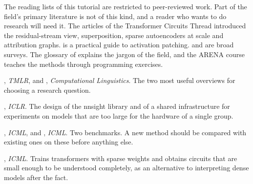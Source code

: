 The reading lists of this tutorial are restricted to peer-reviewed work. Part of the field's primary literature
is not of this kind, and a reader who wants to do research will need it. The articles of the Transformer Circuits
Thread \citep{elhage2021mathematical,elhage2022toy,bricken2023monosemanticity,templeton2024scaling,ameisen2025circuit,lindsey2025biology}
introduced the residual-stream view, superposition, sparse autoencoders at scale and attribution graphs.
\citet{heimersheim2024use} is a practical guide to activation patching. \citet{ferrando2024primer} and
\citet{barez2026understanding} are broad surveys. The glossary of \citet{nanda2022glossary} explains the jargon of
the field, and the ARENA course \citep{mcdougall2023arena} teaches the methods through programming exercises.
\begin{readinglist}
\item \citet{sharkey2025open}, \emph{TMLR}, and \citet{mueller2026quest}, \emph{Computational Linguistics}. The
two most useful overviews for choosing a research question.
\item \citet{fiottokaufman2025nnsight}, \emph{ICLR}. The design of the nnsight library and of a shared
infrastructure for experiments on models that are too large for the hardware of a single group.
\item \citet{mueller2025mib}, \emph{ICML}, and \citet{karvonen2025saebench}, \emph{ICML}. Two benchmarks. A new
method should be compared with existing ones on these before anything else.
\item \citet{gao2025weight}, \emph{ICML}. Trains transformers with sparse weights and obtains circuits that are
small enough to be understood completely, as an alternative to interpreting dense models after the fact.
\end{readinglist}
